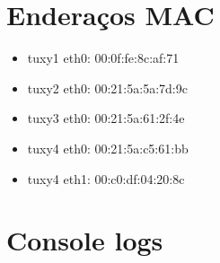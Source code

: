 \documentclass[11pt,a4paper,reqno]{report}
\numberwithin{equation}{section}
\begin{document}


\begin{appendices}

\chapter{Enderaços MAC}
\label{mac_addresses}
\begin{itemize} 
\item tuxy1 eth0: 00:0f:fe:8c:af:71
\item tuxy2 eth0: 00:21:5a:5a:7d:9c
\item tuxy3 eth0: 00:21:5a:61:2f:4e
\item tuxy4 eth0: 00:21:5a:c5:61:bb
\item tuxy4 eth1: 00:c0:df:04:20:8c
\end{itemize}

\chapter{Console logs}%


\end{appendices}
\end{document}
